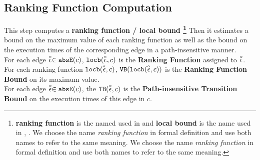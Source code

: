 \subsection{Ranking Function Computation}
\label{sec:ranking}
This step computes a 
\textbf{ranking function / local bound
\footnote{\textbf{ranking function} is the named used in \cite{SinnZV14}
and \textbf{local bound} is the name used in \cite{ZulegerGSV11}, \cite{sinn2017complexity}.
We choose the name \emph{ranking function} in formal definition and use both names to refer to the same meaning.
We choose the name \emph{ranking function} in formal definition and use both names to refer to the same meaning.
}}
Then it estimates a bound on the maximum value of each ranking function as well as
the bound on the execution times of the corresponding edge in a path-insensitive manner.
\\
For each edge $\stackrel{\scriptscriptstyle{\alpha}}{\mathtt{\epsilon}{}} \in \mathtt{abs}{\mathtt{E}}(c)$,
$\mathtt{locb}(\stackrel{\scriptscriptstyle{\alpha}}{\mathtt{\epsilon}{}}, c)$ is the \textbf{Ranking Function} assigned to $\stackrel{\scriptscriptstyle{\alpha}}{\mathtt{\epsilon}{}}$.
\\
For each ranking function $\mathtt{locb}(\stackrel{\scriptscriptstyle{\alpha}}{\mathtt{\epsilon}{}}, c)$, ${\mathtt{VB}}(\mathtt{locb}(\stackrel{\scriptscriptstyle{\alpha}}{\mathtt{\epsilon}{}}, c))$ is
the \textbf{Ranking Function Bound} on its maximum value.
\\
For each edge $\stackrel{\scriptscriptstyle{\alpha}}{\mathtt{\epsilon}{}} \in \mathtt{abs}{\mathtt{E}}(c)$, the ${\mathtt{TB}}(\stackrel{\scriptscriptstyle{\alpha}}{\mathtt{\epsilon}{}}, c)$ is the \textbf{Path-insensitive Transition Bound}
on the execution times of this edge in $c$.
